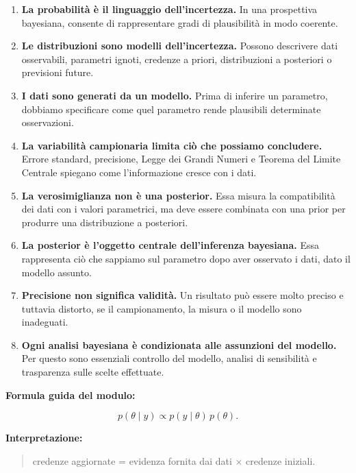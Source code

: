 \documentclass[
  italian,
  letterpaper,
  a4paper,
  11pt,
  open=any]{scrbook}
\theoremstyle{plain}
\theoremstyle{definition}
\theoremstyle{definition}
\theoremstyle{remark}
\begin{document}
\begin{tcolorbox}[enhanced jigsaw, arc=.35mm, bottomrule=.15mm, bottomtitle=1mm, breakable, colback=white, colbacktitle=quarto-callout-important-color!10!white, colframe=quarto-callout-important-color-frame, coltitle=black, left=2mm, leftrule=.75mm, opacityback=0, opacitybacktitle=0.6, rightrule=.15mm, title=\textcolor{quarto-callout-important-color}{\faExclamation}\hspace{0.5em}{Importante}, titlerule=0mm, toprule=.15mm, toptitle=1mm]

\begin{enumerate}
\def\labelenumi{\arabic{enumi}.}
\item
  \textbf{La probabilità è il linguaggio dell'incertezza.} In una
  prospettiva bayesiana, consente di rappresentare gradi di plausibilità
  in modo coerente.
\item
  \textbf{Le distribuzioni sono modelli dell'incertezza.} Possono
  descrivere dati osservabili, parametri ignoti, credenze a priori,
  distribuzioni a posteriori o previsioni future.
\item
  \textbf{I dati sono generati da un modello.} Prima di inferire un
  parametro, dobbiamo specificare come quel parametro rende plausibili
  determinate osservazioni.
\item
  \textbf{La variabilità campionaria limita ciò che possiamo
  concludere.} Errore standard, precisione, Legge dei Grandi Numeri e
  Teorema del Limite Centrale spiegano come l'informazione cresce con i
  dati.
\item
  \textbf{La verosimiglianza non è una posterior.} Essa misura la
  compatibilità dei dati con i valori parametrici, ma deve essere
  combinata con una prior per produrre una distribuzione a posteriori.
\item
  \textbf{La posterior è l'oggetto centrale dell'inferenza bayesiana.}
  Essa rappresenta ciò che sappiamo sul parametro dopo aver osservato i
  dati, dato il modello assunto.
\item
  \textbf{Precisione non significa validità.} Un risultato può essere
  molto preciso e tuttavia distorto, se il campionamento, la misura o il
  modello sono inadeguati.
\item
  \textbf{Ogni analisi bayesiana è condizionata alle assunzioni del
  modello.} Per questo sono essenziali controllo del modello, analisi di
  sensibilità e trasparenza sulle scelte effettuate.
\end{enumerate}

\textbf{Formula guida del modulo:}

\[
p(\theta \mid y) \propto p(y \mid \theta)\,p(\theta).
\]

\textbf{Interpretazione:}

\begin{quote}
credenze aggiornate = evidenza fornita dai dati × credenze iniziali.
\end{quote}

\end{tcolorbox}
\end{document}
